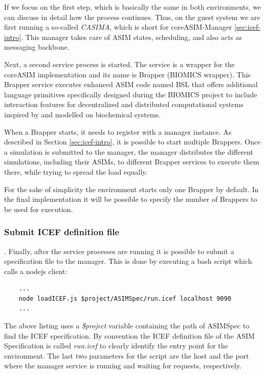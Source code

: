 If we focus on the first step, which is basically the same in both environments, we can discuss in detail how the process continues. Thus, on the guest system we are first running a so-called \textit{CASIMA}, which is short for coreASIM-Manager \ref{sec:icef-intro}. This manager takes care of ASIM states, scheduling, and also acts as messaging backbone.

Next, a second service process is started. The service is a wrapper for the coreASIM implementation and its name is Brapper (BIOMICS wrapper). This Brapper service executes enhanced ASIM code named BSL that offers additional language primitives specifically designed during the BIOMICS project to include interaction features for decentralized and distributed computational systems inspired by and modelled on biochemical systems.

When a Brapper starts, it needs to register with a manager instance. As described in Section \ref{sec:icef-intro}, it is possible to start multiple Brappers. Once a simulation is submitted to the manager, the manager distributes the different simulations, including their ASIMs, to different Brapper services to execute them there, while trying to spread the load equally.

For the sake of simplicity the environment starts only one Brapper by default. In the final implementation it will be possible to specify the number of Brappers to be used for execution.

\subsubsection{Submit ICEF definition file}. Finally, after the service processes are running it is possible to submit a specification file to the manager. This is done by executing a bash script which calls a  nodejs client:

\begin{lstlisting}
	...
	node loadICEF.js $project/ASIMSpec/run.icef localhost 9090
	...
\end{lstlisting}

The above listing uses a \textit{\$project} variable containing the path of ASIMSpec to find the ICEF specification. By convention the ICEF definition file of the ASIM Specification is called \textit{run.icef} to clearly identify the entry point for the environment. The last two parameters for the script are the host and the port where the manager service is running and waiting for requests, respectively.

